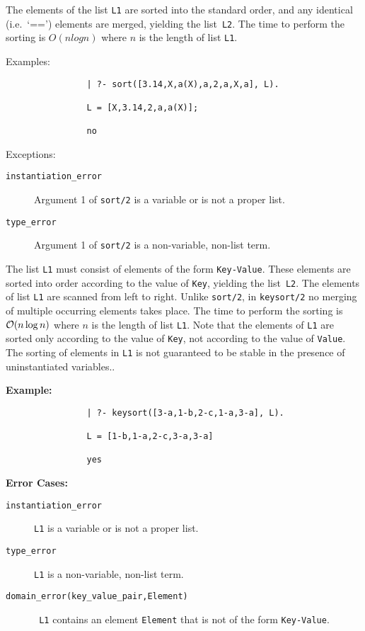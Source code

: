 \begin{description}
    The elements of the list {\tt L1} are sorted into the standard order,
    and any identical (i.e.\ `==') elements are merged, yielding the 
    list~{\tt L2}.  The time to perform the sorting is $O(n log n)$ where 
    $n$ is the length of list {\tt L1}.  

    Examples:
    {\footnotesize
     \begin{verbatim}
                | ?- sort([3.14,X,a(X),a,2,a,X,a], L).

                L = [X,3.14,2,a,a(X)];

                no
     \end{verbatim}}
    Exceptions:
    \begin{description}
    \item[{\tt instantiation\_error}]
	Argument 1 of {\tt sort/2} is a variable or is not a proper list.
    \item[{\tt type\_error}]
	Argument 1 of {\tt sort/2} is a non-variable, non-list term.
    \end{description}

%
The list {\tt L1} must consist of elements of the form
\verb'Key-Value'.  These elements are sorted into order according to
the value of {\tt Key}, yielding the list~{\tt L2}.  The elements of
list {\tt L1} are scanned from left to right.  Unlike {\tt sort/2}, in
{\tt keysort/2} no merging of multiple occurring elements takes place.
The time to perform the sorting is ${\cal O}(n \log n)$ where $n$ is the
length of list {\tt L1}.  Note that the elements of {\tt L1} are
sorted only according to the value of {\tt Key}, not according to the
value of {\tt Value}.  The sorting of elements in {\tt L1} is not
guaranteed to be stable in the presence of uninstantiated variables..

{\bf    Example:}
    {\footnotesize
     \begin{verbatim}
                | ?- keysort([3-a,1-b,2-c,1-a,3-a], L).

                L = [1-b,1-a,2-c,3-a,3-a]

                yes
     \end{verbatim}}
{\bf Error Cases:}
\begin{description} 
\item[{\tt instantiation\_error}]
     {\tt L1} is a variable or is not a proper
     list.  
\item[{\tt type\_error}]
     {\tt L1} is a non-variable, non-list term.
\item[{\tt domain\_error(key\_value\_pair,Element)}] {\tt
     L1} contains an element {\tt Element} that is not of the
     form \verb'Key-Value'.  
\end{description}


\end{description}
